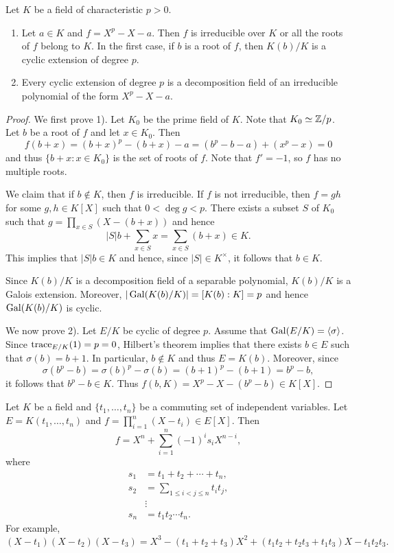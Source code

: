 \begin{proposition}
    Let $K$ be a field of characteristic $p>0$. 
    \begin{enumerate}
        \item Let $a\in K$ and $f=X^p-X-a$. Then 
        $f$ is irreducible over $K$ or all the roots of 
        $f$ belong to $K$. 
        In the first case, if $b$ is a root of $f$, then 
        $K(b)/K$ is a cyclic extension of degree $p$. 
        \item Every cyclic extension of degree $p$ 
        is a decomposition field of an irreducible
        polynomial of the form $X^p-X-a$. 
    \end{enumerate}
\end{proposition}

\begin{proof}
    We first prove 1). 
    Let $K_0$ be the prime field of $K$. Note that $K_0\simeq\mathbb{Z}/p$. 
    Let $b$ be a root of $f$ and let $x\in K_0$. 
    Then
    \[
    f(b+x)=(b+x)^p-(b+x)-a
    =(b^p-b-a)+(x^p-x)=0
    \]
    and thus $\{b+x:x\in K_0\}$ is the set of roots of $f$. Note that 
    $f'=-1$, so $f$ has no multiple roots. 
    
    We claim that if $b\not\in K$, then $f$ is irreducible. If 
    $f$ is not irreducible, then 
    $f=gh$ for some $g,h\in K[X]$ such that $0<\deg g<p$. There exists
    a subset $S$ of $K_0$ such that 
    $g=\prod_{x\in S}(X-(b+x))$ and hence
    \[
    |S|b+\sum_{x\in S}x=\sum_{x\in S}(b+x)\in K.
    \]
    This implies that $|S|b\in K$ and hence, since 
    $|S|\in K^{\times}$, it follows that 
    $b\in K$.
    
    Since $K(b)/K$ is a decomposition field of a separable polynomial, 
    $K(b)/K$ is a Galois extension. Moreover, 
    $|\operatorname{Gal}(K(b)/K)|=[K(b):K]=p$ and hence 
    $\operatorname{Gal}(K(b)/K)$ is cyclic. 
    
    We now prove 2). Let $E/K$ be cyclic of degree $p$. Assume
    that $\operatorname{Gal}(E/K)=\langle\sigma\rangle$. Since
    $\operatorname{trace}_{E/K}(1)=p=0$, Hilbert's theorem 
    implies that there exists $b\in E$ such that 
    $\sigma(b)=b+1$. In particular, $b\not\in K$
    and thus $E=K(b)$. Moreover, since 
    \[
    \sigma(b^p-b)=\sigma(b)^p-\sigma(b)=(b+1)^p-(b+1)=b^p-b, 
    \]
    it follows that $b^p-b\in K$. Thus 
    $f(b,K)=X^p-X-(b^p-b)\in K[X]$. 
\end{proof}


Let $K$ be a field and $\{t_1,\dots,t_n\}$ be a commuting set of  independent variables.  
Let $E=K(t_1,\dots,t_n)$ and $f=\prod_{i=1}^n(X-t_i)\in E[X]$. 
Then
\[
f=X^n+\sum_{i=1}^n (-1)^i s_i X^{n-i},
\]
where 
\begin{align*}
    s_1 &= t_1+t_2+\cdots+t_n,\\
    s_2 &= \sum_{1\leq i<j\leq n}t_it_j,\\
    &\vdots\\
    s_n &= t_1t_2\cdots t_n.
\end{align*}
For example, 
\[
(X-t_1)(X-t_2)(X-t_3)=X^3-(t_1+t_2+t_3)X^2+(t_1t_2+t_2t_3+t_1t_3)X-t_1t_2t_3.
\]

